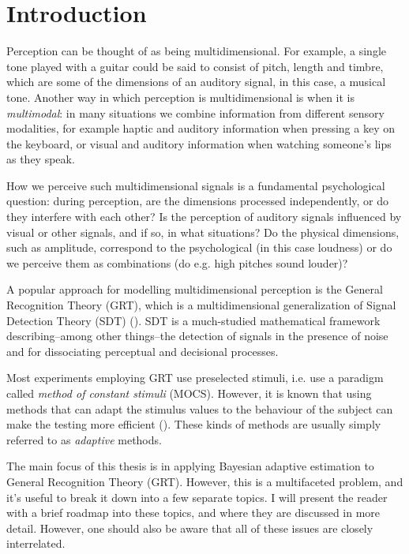 \documentclass{article}\usepackage{knitr}
\begin{document}
\newpage

\tableofcontents

\newpage

\setcounter{page}{1}

\newpage


\section{Introduction}

Perception can be thought of as being multidimensional. For example, a single tone played with a guitar could be said to consist of pitch, length and timbre, which are some of the dimensions of an auditory signal, in this case, a musical tone. Another way in which perception is multidimensional is when it is \textit{multimodal}: in many situations we combine information from different sensory modalities, for example haptic and auditory information when pressing a key on the keyboard, or visual and auditory information when watching someone's lips as they speak.

How we perceive such multidimensional signals is a fundamental psychological question: during perception, are the dimensions processed independently, or do they interfere with each other? Is the perception of auditory signals influenced by visual or other signals, and if so, in what situations? Do the physical dimensions, such as amplitude, correspond to the psychological (in this case loudness) or do we perceive them as combinations (do e.g. high pitches sound louder)?

A popular approach for modelling multidimensional perception is the General Recognition Theory (GRT), which is a multidimensional generalization of Signal Detection Theory (SDT) (\citealp{wickens2002,ashby1986, ashby2015}). SDT is a much-studied mathematical framework describing--among other things--the detection of signals in the presence of noise and for dissociating perceptual and decisional processes. 

Most experiments employing GRT use preselected stimuli, i.e. use a paradigm called \textit{method of constant stimuli} (MOCS).  However, it is known that using methods that can adapt the stimulus values to the behaviour of the subject can make the testing more efficient (\citealp{kontsevichtyler1999}). These kinds of methods are usually simply referred to as \textit{adaptive} methods.

The main focus of this thesis is in applying Bayesian adaptive estimation to General Recognition Theory (GRT). However, this is a multifaceted problem, and it's useful to break it down into a few separate topics. I will present the reader with a brief roadmap into these topics, and where they are discussed in more detail. However, one should also be aware that all of these issues are closely interrelated.
\end{document}
